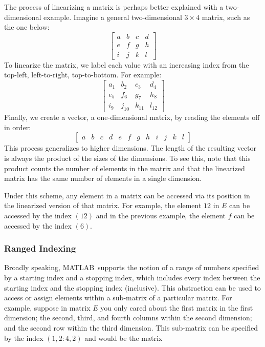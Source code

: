 \documentclass[11pt,conference]{IEEEtran}
\newcommand{\matlab}{MATLAB}
\theoremstyle{plain} %
\theoremstyle{definition}
\theoremstyle{remark}
\begin{document}
The process of linearizing a matrix is perhaps better explained with a
two-dimensional example. Imagine a general two-dimensional \(3 \times 4\) matrix,
such as the one below:
\begin{equation*}
    \begin{bmatrix}
        a & b & c & d \\
        e & f & g & h \\
        i & j & k & l
    \end{bmatrix}
\end{equation*}
To linearize the matrix, we label each value with an increasing index from the
top-left, left-to-right, top-to-bottom. For example:
\begin{equation*}
    \begin{bmatrix}
        a_1 & b_2 & c_3 & d_4 \\
        e_5 & f_6 & g_7 & h_8 \\
        i_9 & j_{10} & k_{11} & l_{12}
    \end{bmatrix}
\end{equation*}
Finally, we create a vector, a one-dimensional matrix, by reading the elements
off in order:
\setcounter{MaxMatrixCols}{20}
\begin{equation*}
    \begin{bmatrix}
        a & b & c & d & e & f & g & h & i & j & k & l
    \end{bmatrix}
\end{equation*}
This process generalizes to higher dimensions. The length of the resulting
vector is always the product of the sizes of the dimensions. To see this, note
that this product counts the number of elements in the matrix and that the
linearized matrix has the same number of elements in a single dimension.

Under this scheme, any element in a matrix can be accessed via its position in
the linearized version of that matrix. For example, the element \(12\) in \(E\)
can be accessed by the index \((12)\) and in the previous example, the element
\(f\) can be accessed by the index \((6)\).

\subsubsection{Ranged Indexing}\label{S:ranged_indexing}

Broadly speaking, \matlab\ supports the notion of a range of numbers specified
by a starting index and a stopping index, which includes every index between the
starting index and the stopping index (inclusive). This abstraction can be used
to access or assign elements within a sub-matrix of a particular matrix. For
example, suppose in matrix \(E\) you only cared about the first matrix in the
first dimension; the second, third, and fourth columns within the second
dimension; and the second row within the third dimension. This sub-matrix can be
specified by the index \((1, 2:4, 2)\) and would be the matrix
\end{document}
